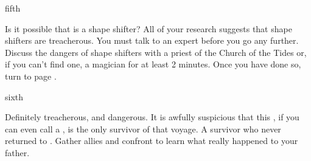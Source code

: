 \documentclass[greennotebook]{NeptuneBall}
\begin{document}
\begin{page}{fifth}

Is it possible that \cGeneral{} is a shape shifter? All of your research suggests that shape shifters are treacherous. You must talk to an expert before you go any further. Discuss the dangers of shape shifters with a priest of the Church of the Tides or, if you can't find one, a magician for at least 2 minutes. Once you have done so, turn to page .

\end{page}

\begin{page}{sixth}

Definitely treacherous, and dangerous. It is awfully suspicious that this \cGeneral{\human}, if you can even call \cGeneral{\them} a \cGeneral{\human}, is the only survivor of that voyage. A survivor who never returned to \pAmerica{}. Gather allies and confront \cGeneral{\them} to learn what really happened to your father.

\end{page}

\endnotebook
\end{document}
